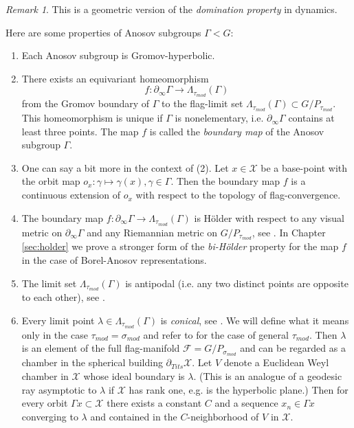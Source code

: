 \documentclass[12pt]{amsbook}%
\theoremstyle{definition}
\theoremstyle{remark}
\newtheorem{rem}[thm]{Remark}
\numberwithin{section}{chapter}
\numberwithin{subsection}{section}
\numberwithin{figure}{chapter}
\def\tits{\partial_{Tits}}
\def\taumod{\tau_{mod}}
\def\simod{\sigma_{mod}}
\def\cF{{\mathscr{F}}}
\def\cX{{\mathscr{X}}}
\def\Ga{\Gamma}
\def\ga{\gamma}
\def\La{\Lambda}
\def\la{\lambda}
\def\geo{\partial_\infty}
\begin{document}
{{\begin{rem}
This is a geometric version of the {\em domination property} in dynamics. 
\end{rem}

\medskip 
Here are some properties of Anosov subgroups $\Ga< G$: 


\begin{enumerate}
\item Each Anosov subgroup is Gromov-hyperbolic. 

\item There exists an equivariant homeomorphism 
$$f: \geo \Ga \to \La_{\taumod}(\Ga)$$
from the Gromov boundary of $\Ga$ to the flag-limit set 
$\La_{\taumod}(\Ga)\subset G/P_{\taumod}$. This homeomorphism is unique if $\Ga$ is nonelementary, i.e. $\geo \Ga$ contains at least three points.   The map $f$ is called the {\em boundary map} of the Anosov subgroup $\Gamma$. 

\item One can say a bit more in the context of (2). Let $x\in \cX$ be a base-point with the orbit map 
$o_x: \ga \mapsto \ga(x), \ga\in \Ga$. Then the boundary map $f$ is a continuous extension of $o_x$ with respect to the topology of flag-convergence. 

\item The boundary map $f: \geo \Ga\to \La_{\taumod}(\Ga)$ is H\"older with respect to any visual metric on $\geo \Ga$ and any Riemannian metric on $G/P_{\taumod}$, see \cite[Theorem 1.6]{Tsouvalas}. In Chapter \ref{sec:holder} we prove a stronger form of the {\em bi-H\"older} property for the map $f$ in the case of Borel-Anosov representations.  


\item The limit set $\La_{\taumod}(\Ga)$ is antipodal (i.e. any two distinct points are opposite to each other), see \cite{KLP17}. 

\item Every limit point $\la\in \La_{\taumod}(\Ga)$ is {\em conical}, see \cite{KLP17}. We will define what it means only in the case $\taumod=\simod$ and refer to \cite{KLP17} for the case 
of general $\taumod$. Then $\la$ is an element of the full flag-manifold $\cF=G/P_{\simod}$ and can be regarded as a chamber in the spherical building $\tits \cX$. Let $V$ denote a Euclidean Weyl chamber in $\cX$ whose ideal boundary is $\la$. (This is an analogue of a geodesic ray asymptotic to $\la$ if $\cX$ has rank one, e.g. is the hyperbolic plane.) Then for every orbit $\Ga x\subset \cX$ there exists a constant $C$ and a sequence $x_n\in \Ga x$ converging to $\la$ and contained in the $C$-neighborhood of $V$ in $\cX$.  



\end{enumerate}}}
\end{document}
